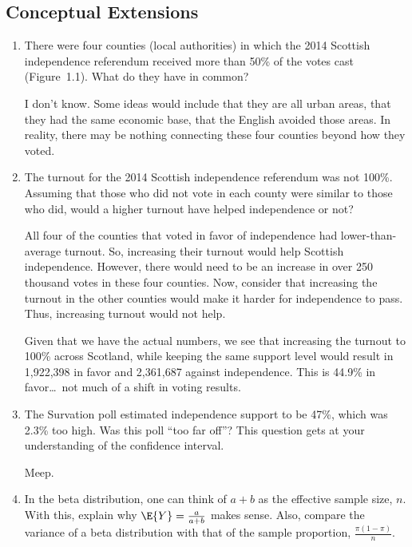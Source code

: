 \subsection*{Conceptual Extensions}
\begin{enumerate}

 \item There were four counties (local authorities) in which the 2014 Scottish independence referendum received more than 50\% of the votes cast (Figure~1.1). What do they have in common?
\begin{solution}
I don't know. Some ideas would include that they are all urban areas, that they had the same economic base, that the English avoided those areas. In reality, there may be nothing connecting these four counties beyond how they voted. 
\end{solution}
%


 \item The turnout for the 2014 Scottish independence referendum was not 100\%. Assuming that those who did not vote in each county were similar to those who did, would a higher turnout have helped independence or not?
\begin{solution}
All four of the counties that voted in favor of independence had lower-than-average turnout. So, increasing their turnout would help Scottish independence. However, there would need to be an increase in over 250 thousand votes in these four counties. Now, consider that increasing the turnout in the other counties would make it harder for independence to pass. Thus, increasing turnout would not help.

Given that we have the actual numbers, we see that increasing the turnout to 100\% across Scotland, while keeping the same support level would result in 1,922,398 in favor and 2,361,687 against independence. This is 44.9\% in favor\ldots\ not much of a shift in voting results.

\end{solution}
%



 \item The Survation poll estimated independence support to be 47\%, which was 2.3\% too high. Was this poll ``too far off''? This question gets at your understanding of the confidence interval.
\begin{solution}
Meep.
\end{solution}

  \item In the beta distribution, one can think of $a+b$ as the effective sample size, $n$. With this, explain why $\E{Y} = \frac{a}{a+b}$ makes sense. Also, compare the variance of a beta distribution with that of the sample proportion, $\frac{\pi(1-\pi)}{n}$.


\end{enumerate}
